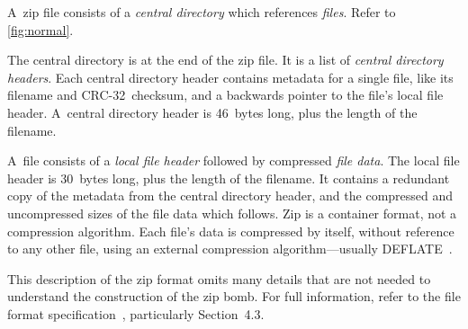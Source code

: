 \documentclass[letterpaper,twocolumn,10pt]{article}
\newcommand{\CRC}{\mbox{CRC-32}}
\begin{document}
A~zip file consists of
a \emph{central directory} which references
\emph{files}.
Refer to \autoref{fig:normal}.

The central directory is at the end of the zip file.
It is a list of \emph{central directory headers}.
Each central directory header contains metadata for a single file,
like its filename and \CRC\ checksum,
and a backwards pointer to the file's local file header.
A~central directory header is 46~bytes long,
plus the length of the filename.

A~file consists of a \emph{local file header}
followed by compressed \emph{file data}.
The local file header is 30~bytes long,
plus the length of the filename.
It contains a redundant copy
of the metadata from the central directory header,
and the compressed and uncompressed sizes of the file data
which follows.
Zip is a container format, not a compression algorithm.
Each file's data is compressed by itself,
without reference to any other file,
using an external compression algorithm---usually DEFLATE~\cite{rfc1951}.

This description of the zip format omits many details that
are not needed to understand the construction of the zip bomb.
For full information,
refer to the file format specification~\cite{appnote},
particularly Section~4.3.
\end{document}
